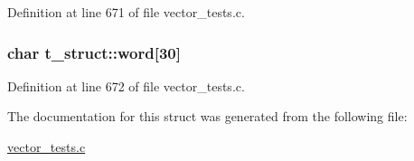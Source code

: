 Definition at line 671 of file vector\-\_\-tests.\-c.

\hypertarget{structt__struct_ab5b290b572fc4036f1e5efc671098c7f}{
\subsubsection[{word}]{\setlength{\rightskip}{0pt plus 5cm}char t\-\_\-struct\-::word\mbox{[}30\mbox{]}}}\label{structt__struct_ab5b290b572fc4036f1e5efc671098c7f}


Definition at line 672 of file vector\-\_\-tests.\-c.



The documentation for this struct was generated from the following file\-:\begin{DoxyCompactItemize}
\item 
\hyperlink{vector__tests_8c}{vector\-\_\-tests.\-c}\end{DoxyCompactItemize}
